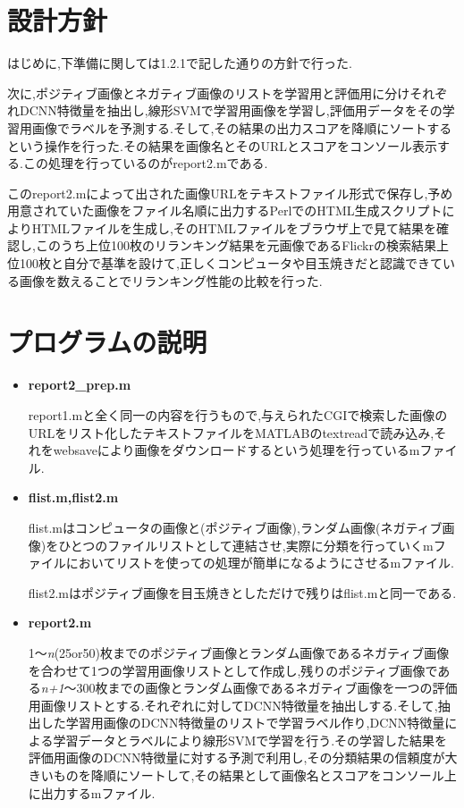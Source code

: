 \documentclass[11pt,a4j]{jreport}
\begin{document}
\section{設計方針}
はじめに,下準備に関しては1.2.1で記した通りの方針で行った.

次に,ポジティブ画像とネガティブ画像のリストを学習用と評価用に分けそれぞれDCNN特徴量を抽出し,線形SVMで学習用画像を学習し,評価用データをその学習用画像でラベルを予測する.そして,その結果の出力スコアを降順にソートするという操作を行った.その結果を画像名とそのURLとスコアをコンソール表示する.この処理を行っているのがreport2.mである.

このreport2.mによって出された画像URLをテキストファイル形式で保存し,予め用意されていた画像をファイル名順に出力するPerlでのHTML生成スクリプトによりHTMLファイルを生成し,そのHTMLファイルをブラウザ上で見て結果を確認し,このうち上位100枚のリランキング結果を元画像であるFlickrの検索結果上位100枚と自分で基準を設けて,正しくコンピュータや目玉焼きだと認識できている画像を数えることでリランキング性能の比較を行った.

\section{プログラムの説明}
\begin{itemize}
\item \textbf{report2\_prep.m}

  report1.mと全く同一の内容を行うもので,与えられたCGIで検索した画像のURLをリスト化したテキストファイルをMATLABのtextreadで読み込み,それをwebsaveにより画像をダウンロードするという処理を行っているmファイル. 
\item \textbf{flist.m,flist2.m}

  flist.mはコンピュータの画像と(ポジティブ画像),ランダム画像(ネガティブ画像)をひとつのファイルリストとして連結させ,実際に分類を行っていくmファイルにおいてリストを使っての処理が簡単になるようにさせるmファイル.

  flist2.mはポジティブ画像を目玉焼きとしただけで残りはflist.mと同一である.
\item \textbf{report2.m}
  
1〜\textit{n}(25or50)枚までのポジティブ画像とランダム画像であるネガティブ画像を合わせて1つの学習用画像リストとして作成し,残りのポジティブ画像である\textit{n+1}〜300枚までの画像とランダム画像であるネガティブ画像を一つの評価用画像リストとする.それぞれに対してDCNN特徴量を抽出しする.そして,抽出した学習用画像のDCNN特徴量のリストで学習ラベル作り,DCNN特徴量による学習データとラベルにより線形SVMで学習を行う.その学習した結果を評価用画像のDCNN特徴量に対する予測で利用し,その分類結果の信頼度が大きいものを降順にソートして,その結果として画像名とスコアをコンソール上に出力するmファイル.
\end{itemize}
\end{document}
